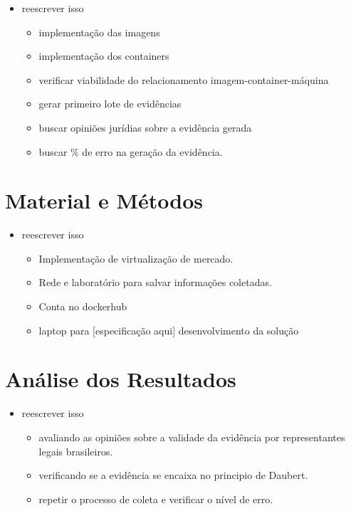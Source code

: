 \documentclass[
	12pt,				%
	openright,			%
	oneside,			%
	a4paper,			%
	english,			%
	french,				%
	spanish,			%
	brazil,				%
	]{abntex2}
\begin{document}
\begin{itemize}
 \item reescrever isso
 
 \begin{itemize}
  \item implementação das imagens
  \item implementação dos containers
  \item verificar viabilidade do relacionamento imagem-container-máquina
  \item gerar primeiro lote de evidências
  \item buscar opiniões jurídias sobre a evidência gerada
  \item buscar \% de erro na geração da evidência.
 \end{itemize}

\end{itemize}

\chapter{Material e Métodos}

\begin{itemize}
 \item reescrever isso
 
 \begin{itemize}
  \item Implementação de virtualização de mercado.
  \item Rede e laboratório para salvar informações coletadas.
  \item Conta no dockerhub
  \item laptop para [especificação aqui] desenvolvimento da solução
 \end{itemize}

\end{itemize}

\chapter{Análise dos Resultados}

\begin{itemize}
 \item reescrever isso
 
 \begin{itemize}
  \item avaliando as opiniões sobre a validade da evidência por representantes legais brasileiros.
  \item verificando se a evidência se encaixa no principio de Daubert.
  \item repetir o processo de coleta e verificar o nível de erro.
 \end{itemize}

\end{itemize}
\end{document}
